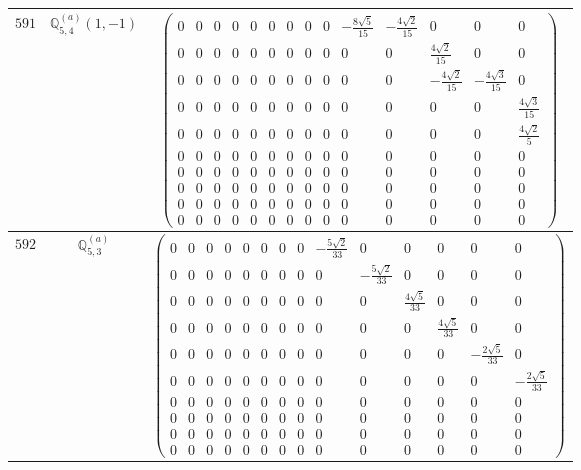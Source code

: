 \documentclass[fleqn,8pt,landscape]{jsarticle}
\begin{document}
\begin{center}
\begin{longtable}{ccc}
$ 591 $ & $ \mathbb{Q}_{5,4}^{(a)}(1,-1) $ & $ \begin{pmatrix} 0 & 0 & 0 & 0 & 0 & 0 & 0 & 0 & 0 & - \frac{8 \sqrt{5}}{15} & - \frac{4 \sqrt{2}}{15} & 0 & 0 & 0 \\ 0 & 0 & 0 & 0 & 0 & 0 & 0 & 0 & 0 & 0 & 0 & \frac{4 \sqrt{2}}{15} & 0 & 0 \\ 0 & 0 & 0 & 0 & 0 & 0 & 0 & 0 & 0 & 0 & 0 & - \frac{4 \sqrt{2}}{15} & - \frac{4 \sqrt{3}}{15} & 0 \\ 0 & 0 & 0 & 0 & 0 & 0 & 0 & 0 & 0 & 0 & 0 & 0 & 0 & \frac{4 \sqrt{3}}{15} \\ 0 & 0 & 0 & 0 & 0 & 0 & 0 & 0 & 0 & 0 & 0 & 0 & 0 & \frac{4 \sqrt{2}}{5} \\ 0 & 0 & 0 & 0 & 0 & 0 & 0 & 0 & 0 & 0 & 0 & 0 & 0 & 0 \\ 0 & 0 & 0 & 0 & 0 & 0 & 0 & 0 & 0 & 0 & 0 & 0 & 0 & 0 \\ 0 & 0 & 0 & 0 & 0 & 0 & 0 & 0 & 0 & 0 & 0 & 0 & 0 & 0 \\ 0 & 0 & 0 & 0 & 0 & 0 & 0 & 0 & 0 & 0 & 0 & 0 & 0 & 0 \\ 0 & 0 & 0 & 0 & 0 & 0 & 0 & 0 & 0 & 0 & 0 & 0 & 0 & 0 \end{pmatrix} $ \\ \hline
$ 592 $ & $ \mathbb{Q}_{5,3}^{(a)} $ & $ \begin{pmatrix} 0 & 0 & 0 & 0 & 0 & 0 & 0 & 0 & - \frac{5 \sqrt{2}}{33} & 0 & 0 & 0 & 0 & 0 \\ 0 & 0 & 0 & 0 & 0 & 0 & 0 & 0 & 0 & - \frac{5 \sqrt{2}}{33} & 0 & 0 & 0 & 0 \\ 0 & 0 & 0 & 0 & 0 & 0 & 0 & 0 & 0 & 0 & \frac{4 \sqrt{5}}{33} & 0 & 0 & 0 \\ 0 & 0 & 0 & 0 & 0 & 0 & 0 & 0 & 0 & 0 & 0 & \frac{4 \sqrt{5}}{33} & 0 & 0 \\ 0 & 0 & 0 & 0 & 0 & 0 & 0 & 0 & 0 & 0 & 0 & 0 & - \frac{2 \sqrt{5}}{33} & 0 \\ 0 & 0 & 0 & 0 & 0 & 0 & 0 & 0 & 0 & 0 & 0 & 0 & 0 & - \frac{2 \sqrt{5}}{33} \\ 0 & 0 & 0 & 0 & 0 & 0 & 0 & 0 & 0 & 0 & 0 & 0 & 0 & 0 \\ 0 & 0 & 0 & 0 & 0 & 0 & 0 & 0 & 0 & 0 & 0 & 0 & 0 & 0 \\ 0 & 0 & 0 & 0 & 0 & 0 & 0 & 0 & 0 & 0 & 0 & 0 & 0 & 0 \\ 0 & 0 & 0 & 0 & 0 & 0 & 0 & 0 & 0 & 0 & 0 & 0 & 0 & 0 \end{pmatrix} $ \\ \hline

\end{longtable}
\end{center}
\end{document}
